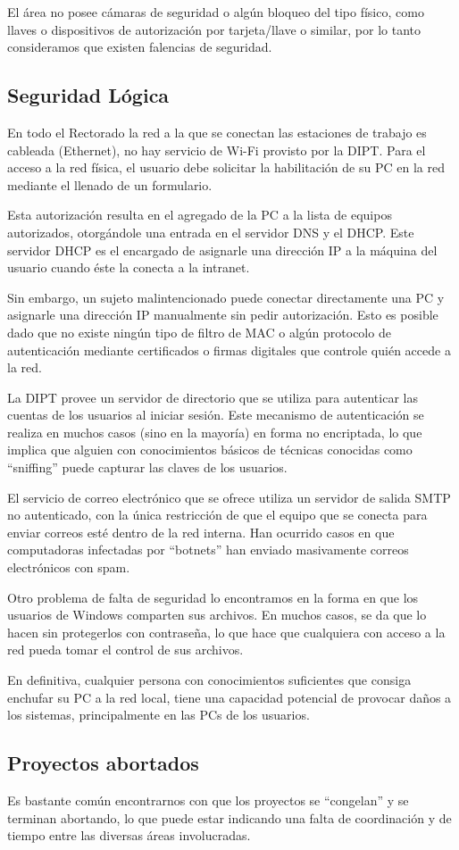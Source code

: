 \documentclass[a4paper,11pt,oneside]{article}
\begin{document}
El área no posee cámaras de seguridad o algún bloqueo del tipo físico,
como llaves o dispositivos de autorización por tarjeta/llave o
similar, por lo tanto consideramos que existen falencias de seguridad.
%
\subsection{Seguridad Lógica}
En todo el Rectorado la red a la que se conectan las estaciones de
trabajo es cableada (Ethernet), no hay servicio de Wi-Fi provisto por
la DIPT. Para el acceso a la red física, el usuario debe solicitar la
habilitación de su PC en la red mediante el llenado de un formulario.

Esta autorización resulta en el agregado de la PC a la lista de
equipos autorizados, otorgándole una entrada en el servidor DNS y el
DHCP. Este servidor DHCP es el encargado de asignarle una dirección IP
a la máquina del usuario cuando éste la conecta a la intranet.

Sin embargo, un sujeto malintencionado puede conectar directamente una
PC y asignarle una dirección IP manualmente sin pedir
autorización. Esto es posible dado que no existe ningún tipo de filtro
de MAC o algún protocolo de autenticación mediante certificados o
firmas digitales que controle quién accede a la red.

La DIPT provee un servidor de directorio  que se utiliza
para autenticar las cuentas de los usuarios al iniciar sesión. Este
mecanismo de autenticación se realiza en muchos casos (sino en la
mayoría) en forma no encriptada, lo que implica que alguien con
conocimientos básicos de técnicas conocidas como ``sniffing'' puede
capturar las claves de los usuarios.

El servicio de correo electrónico que se ofrece utiliza un servidor de
salida SMTP no autenticado, con la única restricción de que el equipo
que se conecta para enviar correos esté dentro de la red interna. Han
ocurrido casos en que computadoras infectadas por ``botnets'' han
enviado masivamente correos electrónicos con spam.

Otro problema de falta de seguridad lo encontramos en la forma en que
los usuarios de Windows comparten sus archivos. En muchos casos, se da
que lo hacen sin protegerlos con contraseña, lo que hace que
cualquiera con acceso a la red pueda tomar el control de sus archivos.

En definitiva, cualquier persona con conocimientos suficientes que
consiga enchufar su PC a la red local, tiene una capacidad
potencial de provocar daños a los sistemas, principalmente en las PCs
de los usuarios.
%
\newpage\subsection{Proyectos abortados}
Es bastante común encontrarnos con que los proyectos se ``congelan'' y
se terminan abortando, lo que puede estar indicando una falta de
coordinación y de tiempo entre las diversas áreas involucradas.
\end{document}

